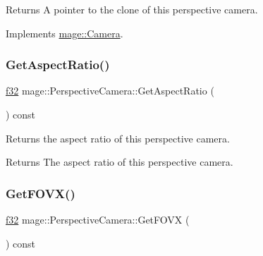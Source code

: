 \begin{DoxyReturn}{Returns}
A pointer to the clone of this perspective camera. 
\end{DoxyReturn}


Implements \hyperlink{classmage_1_1_camera_aedf6e7d6ee6c6e9e82da814ef8e705ab}{mage\+::\+Camera}.

\hypertarget{classmage_1_1_perspective_camera_aab74a3a01418a27e1c0a3b3ab118681e}{}\label{classmage_1_1_perspective_camera_aab74a3a01418a27e1c0a3b3ab118681e} 
\subsubsection{\texorpdfstring{Get\+Aspect\+Ratio()}{GetAspectRatio()}}
{\footnotesize\ttfamily \hyperlink{namespacemage_a6a44ad388483959dc4dff9f2aef91431}{f32} mage\+::\+Perspective\+Camera\+::\+Get\+Aspect\+Ratio (\begin{DoxyParamCaption}{ }\end{DoxyParamCaption}) const\hspace{0.3cm}{\ttfamily [noexcept]}}

Returns the aspect ratio of this perspective camera.

\begin{DoxyReturn}{Returns}
The aspect ratio of this perspective camera. 
\end{DoxyReturn}
\hypertarget{classmage_1_1_perspective_camera_aee867dfe72f18fe15a720b147ecf0cf8}{}\label{classmage_1_1_perspective_camera_aee867dfe72f18fe15a720b147ecf0cf8} 
\subsubsection{\texorpdfstring{Get\+F\+O\+V\+X()}{GetFOVX()}}
{\footnotesize\ttfamily \hyperlink{namespacemage_a6a44ad388483959dc4dff9f2aef91431}{f32} mage\+::\+Perspective\+Camera\+::\+Get\+F\+O\+VX (\begin{DoxyParamCaption}{ }\end{DoxyParamCaption}) const\hspace{0.3cm}{\ttfamily [noexcept]}}

